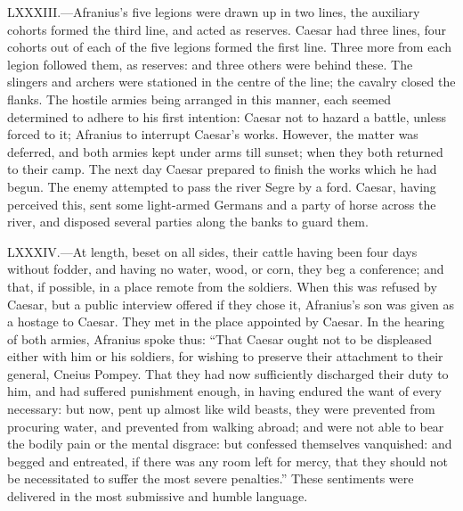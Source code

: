 LXXXIII.—Afranius's five legions were drawn up in two lines, the
auxiliary cohorts formed the third line, and acted as reserves. Caesar
had three lines, four cohorts out of each of the five legions formed the
first line. Three more from each legion followed them, as reserves: and
three others were behind these. The slingers and archers were stationed
in the centre of the line; the cavalry closed the flanks. The hostile
armies being arranged in this manner, each seemed determined to adhere
to his first intention: Caesar not to hazard a battle, unless forced to
it; Afranius to interrupt Caesar's works. However, the matter was
deferred, and both armies kept under arms till sunset; when they both
returned to their camp. The next day Caesar prepared to finish the works
which he had begun. The enemy attempted to pass the river Segre by a
ford. Caesar, having perceived this, sent some light-armed Germans and a
party of horse across the river, and disposed several parties along the
banks to guard them.

LXXXIV.—At length, beset on all sides, their cattle having been four
days without fodder, and having no water, wood, or corn, they beg a
conference; and that, if possible, in a place remote from the soldiers.
When this was refused by Caesar, but a public interview offered if they
chose it, Afranius's son was given as a hostage to Caesar. They met in
the place appointed by Caesar. In the hearing of both armies, Afranius
spoke thus: ``That Caesar ought not to be displeased either with him or
his soldiers, for wishing to preserve their attachment to their general,
Cneius Pompey. That they had now sufficiently discharged their duty to
him, and had suffered punishment enough, in having endured the want of
every necessary: but now, pent up almost like wild beasts, they were
prevented from procuring water, and prevented from walking abroad; and
were not able to bear the bodily pain or the mental disgrace: but
confessed themselves vanquished: and begged and entreated, if there was
any room left for mercy, that they should not be necessitated to suffer
the most severe penalties.'' These sentiments were delivered in the most
submissive and humble language.

